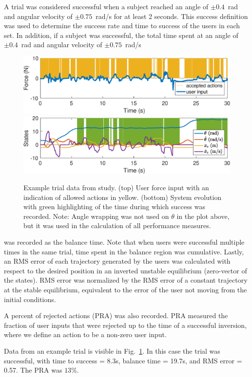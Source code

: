 A trial was considered successful when a subject reached an angle of $\pm0.4$~rad and angular velocity of $\pm0.75$~rad/s for at least 2 seconds. This success definition was used to determine the success rate and time to success of the users in each set. In addition, if a subject was successful, the total time spent at an angle of $\pm0.4$~rad and angular velocity of $\pm0.75$~rad/s 
\begin{figure}[!h]
\begin{center}
  	\includegraphics[width=1\columnwidth, keepaspectratio]{ie_good_user_input.eps}
  	\includegraphics[width=1\columnwidth, keepaspectratio]{ie_good_user_states.eps}
\end{center}
\caption{Example trial data from study. (top) User force input with an indication of allowed actions in yellow. (bottom) System evolution with green highlighting of the time during which success was recorded. Note: Angle wrapping was not used on $\theta$ in the plot above, but it was used in the calculation of all performance measures. }
\label{fig: example_user}
\end{figure}
was recorded as the balance time. Note that when users were successful multiple times in the same trial, time spent in the balance region was cumulative. Lastly, an RMS error of each trajectory generated by the users was calculated with respect to the desired position in an inverted unstable equilibrium (zero-vector of the states). RMS error was normalized by the RMS error of a constant trajectory at the stable equilibrium, equivalent to the error of the user not moving from the initial conditions. 

A percent of rejected actions (PRA) was also recorded. PRA measured the fraction of user inputs that were rejected up to the time of a successful inversion, where we define an action to be a non-zero user input. 

Data from an example trial is visible in Fig.~\ref{fig: example_user}. In this case the trial was successful, with time to success = 8.3s, balance time = 19.7s, and RMS error = 0.57. The PRA was $13\%$.


